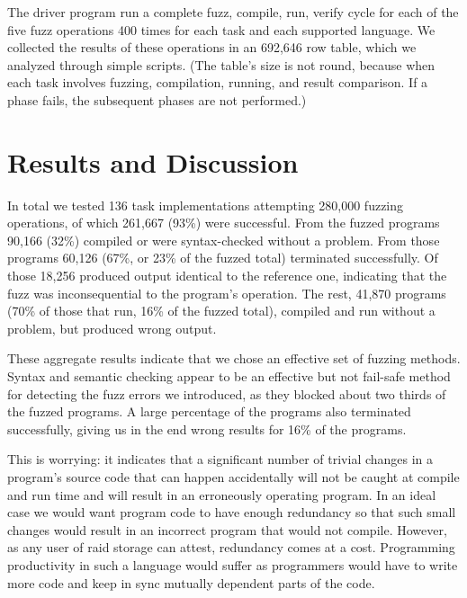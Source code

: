 \documentclass[10pt]{sigplanconf}
\begin{document}
The driver program run a complete fuzz, compile, run, verify cycle
for each of the five fuzz operations 400 times for
each task and each supported language.
We collected the results of these operations in an 692,646 row table,
which we analyzed through simple scripts.
(The table's size is not round, because when each task involves
fuzzing, compilation, running, and result comparison.
If a phase fails, the subsequent phases are not performed.)

\section{Results and Discussion} %
\label{sec:results}

In total we tested
136 task implementations
attempting 280,000 fuzzing operations,
of which 261,667 (93\%) were successful.
From the fuzzed programs 90,166 (32\%)
compiled or were syntax-checked without a problem.
From those programs 60,126 (67\%, or 23\% of the fuzzed total) terminated successfully.
Of those 18,256 produced output identical to the reference one,
indicating that the fuzz was
inconsequential to the program's operation.
The rest, 41,870 programs (70\% of those that run, 16\% of the fuzzed total),
compiled and run without a problem, but produced wrong output.

These aggregate results indicate that we chose an effective set
of fuzzing methods.
Syntax and semantic checking appear to be an effective but not
fail-safe method for detecting the fuzz errors we introduced,
as they blocked about two thirds of the fuzzed programs.
A large percentage of the programs also terminated successfully,
giving us in the end wrong results for 16\% of the programs.

This is worrying:
it indicates that a significant number of trivial changes in a program's source
code that can happen accidentally will not be caught at compile and run
time and will result in an erroneously operating program.
In an ideal case we would want program code to have enough redundancy
so that such small changes would result in an incorrect program
that would not compile.
However, as any user of {\sc raid} storage can attest,
redundancy comes at a cost.
Programming productivity in such a language would suffer as programmers
would have to write more code and keep in sync mutually dependent parts
of the code.
\end{document}
